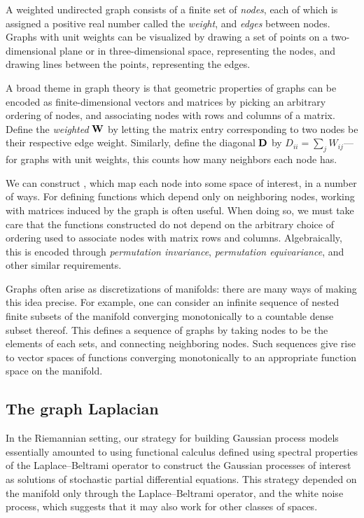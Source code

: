 \documentclass[11pt]{book}
\begin{document}
A weighted undirected graph consists of a finite set of \emph{nodes}, each of which is assigned a positive real number called the \emph{weight}, and \emph{edges} between nodes.
Graphs with unit weights can be visualized by drawing a set of points on a two-dimensional plane or in three-dimensional space, representing the nodes, and drawing lines between the points, representing the edges.

A broad theme in graph theory is that geometric properties of graphs can be encoded as finite-dimensional vectors and matrices by picking an arbitrary ordering of nodes, and associating nodes with rows and columns of a matrix.
Define the \emph{weighted } $\m{W}$ by letting the matrix entry corresponding to two nodes be their respective edge weight.
Similarly, define the diagonal  $\m{D}$ by $D_{ii} = \sum_j W_{ij}$---for graphs with unit weights, this counts how many neighbors each node has.

We can construct , which map each node into some space of interest, in a number of ways.
For defining functions which depend only on neighboring nodes, working with matrices induced by the graph is often useful.
When doing so, we must take care that the functions constructed do not depend on the arbitrary choice of ordering used to associate nodes with matrix rows and columns. Algebraically, this is encoded through \emph{permutation invariance}, \emph{permutation equivariance}, and other similar requirements.


Graphs often arise as discretizations of manifolds: there are many ways of making this idea precise.
For example, one can consider an infinite sequence of nested finite subsets of the manifold converging monotonically to a countable dense subset thereof.
This defines a sequence of graphs by taking nodes to be the elements of each sets, and connecting neighboring nodes.
Such sequences give rise to vector spaces of functions converging monotonically to an appropriate function space on the manifold.

\subsection{The graph Laplacian}

In the Riemannian setting, our strategy for building Gaussian process models essentially amounted to using functional calculus defined using spectral properties of the Laplace--Beltrami operator to construct the Gaussian processes of interest as solutions of stochastic partial differential equations.
This strategy depended on the manifold only through the Laplace--Beltrami operator, and the white noise process, which suggests that it may also work for other classes of spaces.
\end{document}
